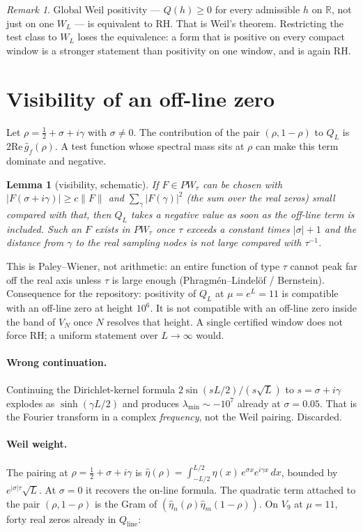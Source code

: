 \documentclass[11pt]{article}
\newtheorem{lemma}[theorem]{Lemma}
\theoremstyle{remark}\newtheorem*{remark}{Remark}
\begin{document}
\begin{remark}
Global Weil positivity --- $Q(h)\ge0$ for every admissible $h$ on
$\mathbb{R}$, not just on one $W_L$ --- is equivalent to RH. That is
Weil's theorem. Restricting the test class to $W_L$ loses the
equivalence: a form that is positive on every compact window is a
stronger statement than positivity on one window, and is again RH.
\end{remark}

\section{Visibility of an off-line zero}
Let $\rho=\tfrac12+\sigma+i\gamma$ with $\sigma\ne0$. The contribution of
the pair $(\rho,1-\rho)$ to $Q_L$ is $2\mathrm{Re}\,\hat g_f(\rho)$.
A test function whose spectral mass sits at $\rho$ can make this term
dominate and negative.

\begin{lemma}[visibility, schematic]
If $F\in PW_\tau$ can be chosen with $|F(\sigma+i\gamma)|\ge c\|F\|$ and
$\sum_{\gamma}|F(\gamma)|^2$ (the sum over the real zeros) small compared with that, then $Q_L$
takes a negative value as soon as the off-line term is included.
Such an $F$ exists in $PW_\tau$ once $\tau$ exceeds a constant times
$|\sigma|+1$ and the distance from $\gamma$ to the real sampling nodes
is not large compared with $\tau^{-1}$.
\end{lemma}
This is Paley--Wiener, not arithmetic: an entire function of type $\tau$
cannot peak far off the real axis unless $\tau$ is large enough
(Phragm\'en--Lindel\"of / Bernstein). Consequence for the repository:
positivity of $Q_L$ at $\mu=e^L=11$ is compatible with an off-line zero
at height $10^6$. It is not compatible with an off-line zero inside the
band of $V_N$ once $N$ resolves that height. A single certified window
does not force RH; a uniform statement over $L\to\infty$ would.

\paragraph{Wrong continuation.}
Continuing the Dirichlet-kernel formula $2\sin(sL/2)/(s\sqrt L)$ to
$s=\sigma+i\gamma$ explodes as $\sinh(\gamma L/2)$ and produces
$\lambda_{\min}\sim-10^7$ already at $\sigma=0.05$. That is the Fourier
transform in a complex \emph{frequency}, not the Weil pairing. Discarded.

\paragraph{Weil weight.}
The pairing at $\rho=\tfrac12+\sigma+i\gamma$ is
$\hat\eta(\rho)=\int_{-L/2}^{L/2}\eta(x)\,e^{\sigma x}e^{i\gamma x}\,dx$,
bounded by $e^{|\sigma|\tau}\sqrt L$. At $\sigma=0$ it recovers the
on-line formula. The quadratic term attached to the pair
$(\rho,1-\rho)$ is the Gram of
$(\hat\eta_n(\rho)\hat\eta_m(1-\rho))$. On $V_9$ at $\mu=11$, forty
real zeros already in $Q_{\mathrm{line}}$:
\end{document}

